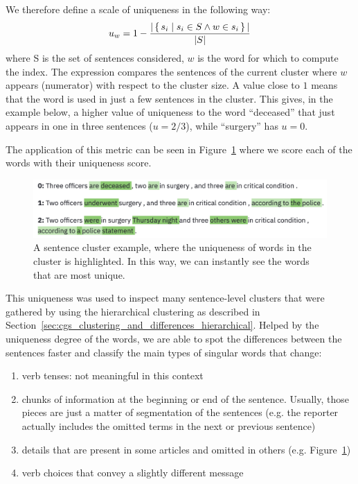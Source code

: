 We therefore define a scale of uniqueness in the following way:
$$u_w = 1 - \frac{|\set{s_i | s_i \in S \land w \in s_i}|}{|S|}$$
where S is the set of sentences considered, $w$ is the word for which to compute the index. The expression compares the sentences of the current cluster where $w$ appears (numerator) with respect to the cluster size.
A value close to $1$ means that the word is used in just a few sentences in the cluster.
This gives, in the example below, a higher value of uniqueness to the word ``deceased'' that just appears in one in three sentences ($u = 2/3$), while ``surgery'' has $u = 0$.

The application of this metric can be seen in Figure~\ref{fig:words_uniqueness} where we score each of the words with their uniqueness score.

\begin{figure}[!htb]
    \centering
    \includegraphics[width=\textwidth]{figures/words_uniqueness.png}
    \caption{A sentence cluster example, where the uniqueness of words in the cluster is highlighted. In this way, we can instantly see the words that are most unique.}
    \label{fig:words_uniqueness}
\end{figure}


This uniqueness was used to inspect many sentence-level clusters that were gathered by using the hierarchical clustering as described in Section~\ref{sec:cgs_clustering_and_differences_hierarchical}. Helped by the uniqueness degree of the words, we are able to spot the differences between the sentences faster and classify the main types of singular words that change:
\begin{enumerate}
    \item verb tenses: not meaningful in this context
    \item chunks of information at the beginning or end of the sentence. Usually, those pieces are just a matter of segmentation of the sentences (e.g. the reporter actually includes the omitted terms in the next or previous sentence) 
    \item details that are present in some articles and omitted in others (e.g. Figure~\ref{fig:words_uniqueness})
    \item verb choices that convey a slightly different message
\end{enumerate}

